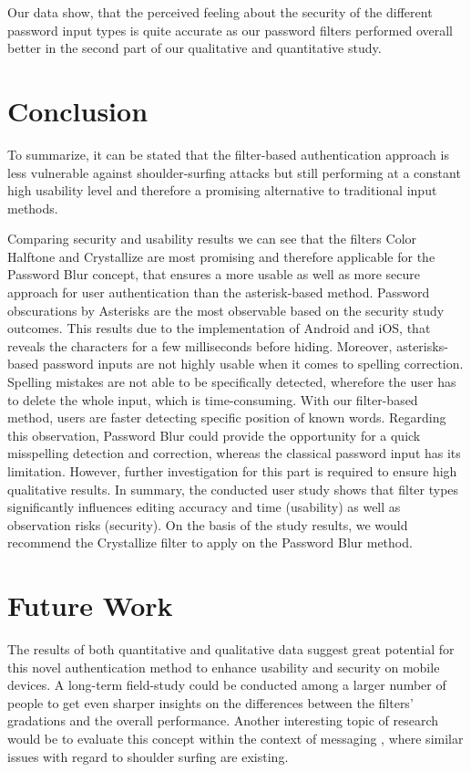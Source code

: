 \documentclass{sigchi}
\begin{document}
Our data show, that the perceived feeling about the security of the different password input types is quite accurate as our password filters performed overall better in the second part of our qualitative and quantitative study.

\section{Conclusion}
To summarize, it can be stated that the filter-based authentication approach is less vulnerable against shoulder-surfing attacks but still performing at a constant high usability level and therefore a promising alternative to traditional input methods.

Comparing security and usability results we can see that the filters Color Halftone and Crystallize are most promising and therefore applicable for the Password Blur concept, that ensures a more usable as well as more secure approach for user authentication than the asterisk-based method. Password obscurations by Asterisks are the most observable based on the security study outcomes. This results due to the implementation of Android and iOS, that reveals the characters for a few milliseconds before hiding. Moreover, asterisks-based password inputs are not highly usable when it comes to spelling correction. Spelling mistakes are not able to be specifically detected, wherefore the user has to delete the whole input, which is time-consuming. With our filter-based method, users are faster detecting specific position of known words. Regarding this observation, Password Blur could provide the opportunity for a quick misspelling detection and correction, whereas the classical password input has its limitation. However, further investigation for this part is required to ensure high qualitative results. In summary, the conducted user study shows that filter types significantly influences editing accuracy and time (usability) as well as observation risks (security). On the basis of the study results, we would recommend the Crystallize filter to apply on the Password Blur method. 

\section{Future Work}
The results of both quantitative and qualitative data suggest great potential for this novel authentication method to enhance usability and security on mobile devices. A long-term field-study could be conducted among a larger number of people to get even sharper insights on the differences between the filters' gradations and the overall performance. Another interesting topic of research would be to evaluate this concept within the context of messaging \cite{eiband2016my}, where similar issues with regard to shoulder surfing are existing.
\end{document}
